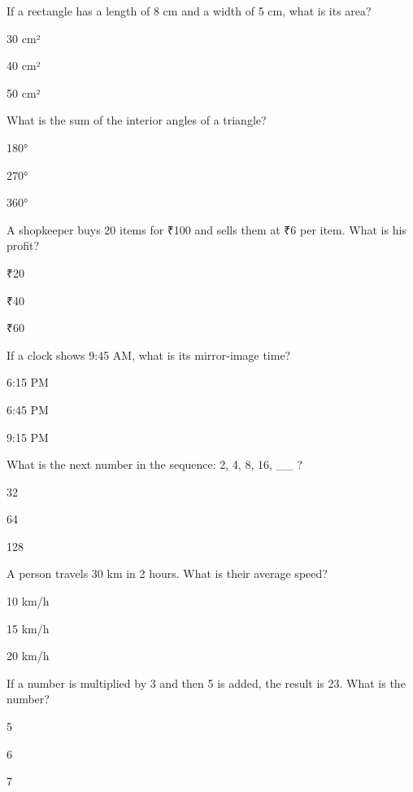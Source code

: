 \begin{enhancedmcq}{If a rectangle has a length of 8 cm and a width of 5 cm, what is its area?}
\item 30 cm²
\item 40 cm²
\item 50 cm²

\end{enhancedmcq}
\begin{enhancedmcq}{What is the sum of the interior angles of a triangle?}
\item 180°
\item 270°
\item 360°

\end{enhancedmcq}
\begin{enhancedmcq}{A shopkeeper buys 20 items for ₹100 and sells them at ₹6 per item. What is his profit?}
\item ₹20
\item ₹40
\item ₹60

\end{enhancedmcq}
\begin{enhancedmcq}{If a clock shows 9:45 AM, what is its mirror-image time?}
\item 6:15 PM
\item 6:45 PM
\item 9:15 PM

\end{enhancedmcq}
\begin{enhancedmcq}{What is the next number in the sequence: 2, 4, 8, 16, __ ?}
\item 32
\item 64
\item 128

\end{enhancedmcq}
\begin{enhancedmcq}{A person travels 30 km in 2 hours. What is their average speed?}
\item 10 km/h
\item 15 km/h
\item 20 km/h

\end{enhancedmcq}
\begin{enhancedmcq}{If a number is multiplied by 3 and then 5 is added, the result is 23. What is the number?}
\item 5
\item 6
\item 7
\end{enhancedmcq}